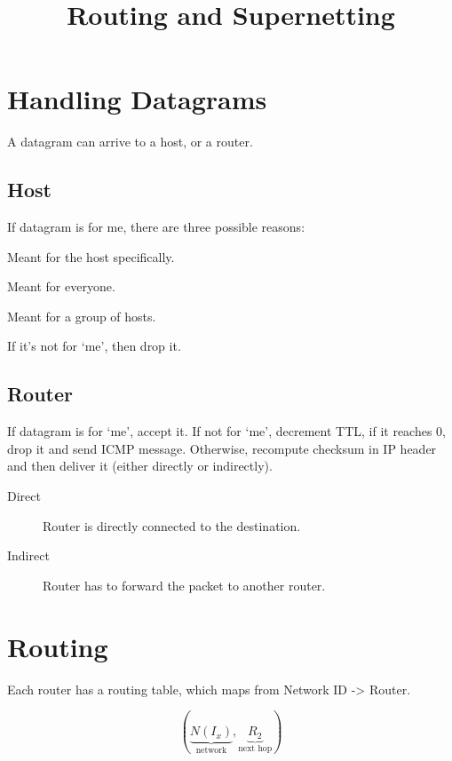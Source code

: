 \documentclass{article}
\title{Routing and Supernetting}
\begin{document}
\maketitle

\section*{Handling Datagrams}

A datagram can arrive to a host, or a router.

\subsection*{Host}
If datagram is for me, there are three possible reasons:
\begin{description}
    \setlength{\itemsep}{0em}
    \item[Unicast] Meant for the host specifically.
    \item[Broadcast] Meant for everyone.
    \item[Multicast] Meant for a group of hosts.
\end{description}

If it's not for `me', then drop it.

\subsection*{Router}
If datagram is for `me', accept it.
If not for `me', decrement TTL, if it reaches 0, drop it and send ICMP message.
Otherwise, recompute checksum in IP header and then deliver it (either directly
or indirectly).

\begin{description}
    \item[Direct] Router is directly connected to the destination.
    \item[Indirect] Router has to forward the packet to another router.
\end{description}

\section*{Routing}
Each router has a routing table, which maps from Network ID -> Router.

\begin{equation*}
    \left(\underbrace{N\left(I_x\right)}_{\text{network}}, \underbrace{R_2}_{\text{next hop}}\right)
\end{equation*}
\end{document}
